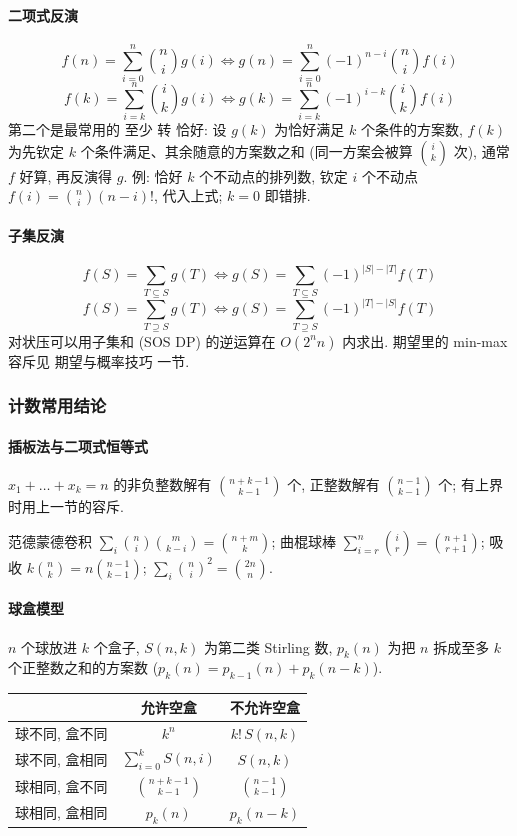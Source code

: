 	\paragraph{二项式反演}
		\[ f(n)=\sum_{i=0}^{n}\binom{n}{i}g(i) \iff g(n)=\sum_{i=0}^{n}(-1)^{n-i}\binom{n}{i}f(i) \]
		\[ f(k)=\sum_{i=k}^{n}\binom{i}{k}g(i) \iff g(k)=\sum_{i=k}^{n}(-1)^{i-k}\binom{i}{k}f(i) \]
		第二个是最常用的 至少 转 恰好: 设 $g(k)$ 为恰好满足 $k$ 个条件的方案数, $f(k)$ 为先钦定 $k$ 个条件满足、其余随意的方案数之和 (同一方案会被算 $\binom{i}{k}$ 次), 通常 $f$ 好算, 再反演得 $g$.
		例: 恰好 $k$ 个不动点的排列数, 钦定 $i$ 个不动点 $f(i)=\binom{n}{i}(n-i)!$, 代入上式; $k=0$ 即错排.
	\paragraph{子集反演}
		\[ f(S)=\sum_{T\subseteq S}g(T) \iff g(S)=\sum_{T\subseteq S}(-1)^{|S|-|T|}f(T) \]
		\[ f(S)=\sum_{T\supseteq S}g(T) \iff g(S)=\sum_{T\supseteq S}(-1)^{|T|-|S|}f(T) \]
		对状压可以用子集和 (SOS DP) 的逆运算在 $O(2^n n)$ 内求出. 期望里的 min-max 容斥见 期望与概率技巧 一节.

\subsubsection{计数常用结论}
	\paragraph{插板法与二项式恒等式}
		\begin{compactitem}
		\item $x_1+\dots+x_k=n$ 的非负整数解有 $\binom{n+k-1}{k-1}$ 个, 正整数解有 $\binom{n-1}{k-1}$ 个; 有上界时用上一节的容斥.
		\item 范德蒙德卷积 $\sum_i\binom{n}{i}\binom{m}{k-i}=\binom{n+m}{k}$; 曲棍球棒 $\sum_{i=r}^{n}\binom{i}{r}=\binom{n+1}{r+1}$; 吸收 $k\binom{n}{k}=n\binom{n-1}{k-1}$; $\sum_i\binom{n}{i}^2=\binom{2n}{n}$.
		\end{compactitem}
	\paragraph{球盒模型}
		$n$ 个球放进 $k$ 个盒子, $S(n,k)$ 为第二类 Stirling 数, $p_k(n)$ 为把 $n$ 拆成至多 $k$ 个正整数之和的方案数 ($p_k(n)=p_{k-1}(n)+p_k(n-k)$).
		\begin{center}
		\begin{tabular}{l|c|c}
		 & 允许空盒 & 不允许空盒 \\ \hline
		球不同, 盒不同 & $k^n$ & $k!\,S(n,k)$ \\
		球不同, 盒相同 & $\sum_{i=0}^{k}S(n,i)$ & $S(n,k)$ \\
		球相同, 盒不同 & $\binom{n+k-1}{k-1}$ & $\binom{n-1}{k-1}$ \\
		球相同, 盒相同 & $p_k(n)$ & $p_k(n-k)$ \\
		\end{tabular}
		\end{center}

